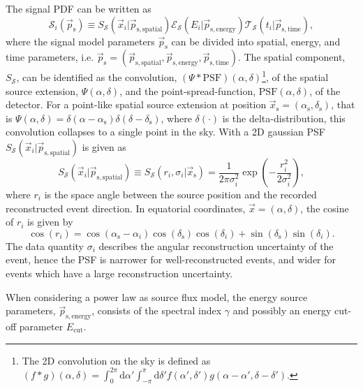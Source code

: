 \documentclass{article}
\newcommand{\ps}{\vec{p}_{\mathrm{s}}}
\newcommand{\xs}{\vec{x}_{\mathrm{s}}}
\begin{document}
The signal PDF can be written as
\begin{equation}
 \mathcal{S}_i(\ps) \equiv S_{\mathcal{S}}(\vec{x}_i|\vec{p}_{\mathrm{s,spatial}}) \mathcal{E}_{\mathcal{S}}(E_i|\vec{p}_{\mathrm{s,energy}}) \mathcal{T}_{\mathcal{S}}(t_i|\vec{p}_{\mathrm{s,time}}),
 \label{eq:Si}
\end{equation}
where the signal model parameters $\ps$ can be divided into spatial, energy, and
time parameters, i.e. $\vec{p}_{\mathrm{s}} = (\vec{p}_{\mathrm{s,spatial}},
\vec{p}_{\mathrm{s,energy}}, \vec{p}_{\mathrm{s,time}})$. The spatial component,
$S_{\mathcal{S}}$, can be identified as the convolution,
$(\Psi \ast \mathrm{PSF})(\alpha,\delta)$\footnote{The 2D convolution on the sky
is defined as
$(f \ast g)(\alpha,\delta) = \int_{0}^{2\pi} \mathrm{d}\alpha' \int_{-\pi}^{\pi} \mathrm{d}\delta' f(\alpha',\delta')g(\alpha-\alpha',\delta-\delta')$.},
of the spatial source extension, $\Psi(\alpha,\delta)$, and the point-spread-function,
$\mathrm{PSF}(\alpha,\delta)$, of the detector.
For a point-like spatial source extension at position
$\xs = (\alpha_{\mathrm{s}},\delta_{\mathrm{s}})$, that is
$\Psi(\alpha,\delta) = \delta(\alpha-\alpha_{\mathrm{s}})\delta(\delta-\delta_{\mathrm{s}})$,
where $\delta(\cdot)$ is the delta-distribution, this convolution collapses to
a single point in the sky. With a 2D gaussian PSF
$S_{\mathcal{S}}(\vec{x}_i|\vec{p}_{\mathrm{s,spatial}})$ is given as
\begin{equation}
 S_{\mathcal{S}}(\vec{x}_i|\vec{p}_{\mathrm{s,spatial}}) \equiv S_{\mathcal{S}}(r_i,\sigma_i|\xs) = \frac{1}{2\pi\sigma_i^2}\exp\left({-\frac{r_i^2}{2\sigma_i^2}}\right),
\end{equation}
where $r_i$ is the space angle between the source position and the recorded
reconstructed event direction. In equatorial coordinates,
$\vec{x} = (\alpha,\delta)$, the cosine of $r_i$ is given by
\begin{equation}
 \cos(r_i) = \cos(\alpha_{\mathrm{s}} - \alpha_i) \cos(\delta_{\mathrm{s}})\cos({\delta_i}) + \sin(\delta_{\mathrm{s}})\sin(\delta_i).
\end{equation}
The data quantity $\sigma_i$ describes the angular reconstruction uncertainty of
the event, hence the PSF is narrower for well-reconstructed events, and wider
for events which have a large reconstruction uncertainty.

When considering a power law as source flux model, the energy source parameters,
$\vec{p}_{\mathrm{s,energy}}$, consists of the spectral index $\gamma$ and possibly
an energy cut-off parameter $E_{\mathrm{cut}}$.
\end{document}
